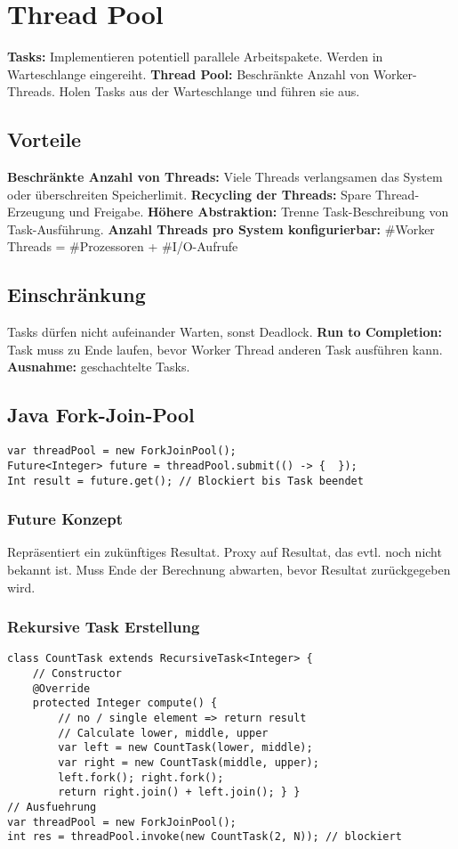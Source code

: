 \section{Thread Pool}
\textbf{Tasks:} Implementieren potentiell parallele Arbeitspakete. Werden in Warteschlange eingereiht.
\textbf{Thread Pool:} Beschränkte Anzahl von Worker-Threads.
Holen Tasks aus der Warteschlange und führen sie aus.

\subsection{Vorteile}
\textbf{Beschränkte Anzahl von Threads:} Viele Threads verlangsamen das System oder überschreiten Speicherlimit. 
\textbf{Recycling der Threads:} Spare Thread-Erzeugung und Freigabe.
\textbf{Höhere Abstraktion:} Trenne Task-Beschreibung von Task-Ausführung.
\textbf{Anzahl Threads pro System konfigurierbar:} \#Worker Threads = \#Prozessoren + \#I/O-Aufrufe 

\subsection{Einschränkung}
Tasks dürfen nicht aufeinander Warten, sonst Deadlock.
\textbf{Run to Completion:} Task muss zu Ende laufen, bevor Worker Thread anderen Task ausführen kann.
\textbf{Ausnahme:} geschachtelte Tasks.

\subsection{Java Fork-Join-Pool}
\begin{lstlisting}
var threadPool = new ForkJoinPool();
Future<Integer> future = threadPool.submit(() -> {  });
Int result = future.get(); // Blockiert bis Task beendet
\end{lstlisting}

\subsubsection{Future Konzept}
Repräsentiert ein zukünftiges Resultat.
Proxy auf Resultat, das evtl. noch nicht bekannt ist. 
Muss Ende der Berechnung abwarten, bevor Resultat zurückgegeben wird.

\subsubsection{Rekursive Task Erstellung}
\begin{lstlisting}
class CountTask extends RecursiveTask<Integer> {
    // Constructor
    @Override
    protected Integer compute() {
        // no / single element => return result
        // Calculate lower, middle, upper
        var left = new CountTask(lower, middle);
        var right = new CountTask(middle, upper);
        left.fork(); right.fork();
        return right.join() + left.join(); } }
// Ausfuehrung 
var threadPool = new ForkJoinPool();
int res = threadPool.invoke(new CountTask(2, N)); // blockiert
\end{lstlisting}

